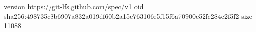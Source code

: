 version https://git-lfs.github.com/spec/v1
oid sha256:498735c8b6907a832a019df60b2a15c763106e5f15f6a70900c52fc284c2f5f2
size 11088
